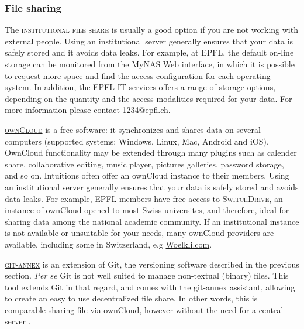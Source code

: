 \subsubsection{File sharing}

\noindent The \textsc{institutional file share} is usually a good option if you are not working with external people.  Using an institutional server generally ensures that your data is safely stored and it avoids data leaks. For example, at EPFL, the default on-line storage can be monitored from \href{http://mynas.epfl.ch}{the MyNAS Web interface}, in which it is possible to request more space and find the access configuration for each operating system. In addition, the EPFL-IT services offers a range of storage options, depending on the quantity and the access modalities required for your data. For more information please contact \href{mailto:1234@epfl.ch}{1234@epfl.ch}. 

\vspace{0.4cm}

\noindent \label{ownCloud}  \textsc{\href{http://owncloud.org}{ownCloud}} is a free software: it synchronizes and shares data on several computers (supported systems: Windows, Linux, Mac, Android and iOS). OwnCloud functionality may be extended through many plugins such as calender share, collaborative editing, music player, pictures galleries, password storage, and so on. Intuitions often offer an ownCloud instance to their members. Using an institutional server generally ensures that your data is safely stored and avoids data leaks. For example, EPFL members have free access to \textsc{\href{http://drive.switch.ch}{SwitchDrive}}, an instance of ownCloud opened to most Swiss universites, and therefore, ideal for sharing data among the national academic community\cite{owncloud_owncloud.org_2015,switchdrive_switchdrive_2015}. If an institutional instance is not available or unsuitable for your  needs, many ownCloud \href{https://owncloud.org/providers/}{providers} are available\cite{owncloud.org_owncloud_2015}, including some in Switzerland, e.g \href{https://woelkli.com}{Woelkli.com}\cite{woelkli_secure_2015}.   

\vspace{0.4cm}

\noindent {}  \textsc{\href{http://git-annex.branchable.com/}{git-annex}} is an extension of Git, the versioning software described in the previous section. \textit{Per se} Git is not well suited to manage non-textual (binary) files. This tool extends Git in that regard, and comes with the git-annex assistant, allowing to create an easy to use decentralized file share. In other words, this is comparable sharing file via ownCloud, however without the need for a central server \cite{git-annex_git-annex_2015}.

